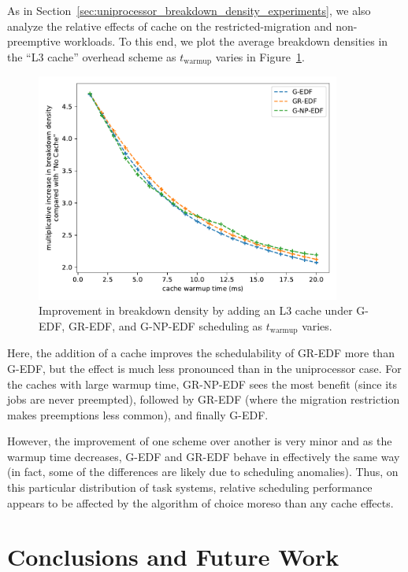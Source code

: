 \documentclass[11pt]{article}
\newcommand{\figref}[1]{Figure~\ref{#1}}
\newcommand{\secref}[1]{Section~\ref{#1}}
\begin{document}
As in \secref{sec:uniprocessor_breakdown_density_experiments}, we also analyze the relative effects of cache on the restricted-migration and non-preemptive workloads. To this end, we plot the average breakdown densities in the ``L3 cache'' overhead scheme as $t_\text{warmup}$ varies in \figref{fig:multiprocessor_cache_warmup_plots}.

\begin{figure}
	\centering
	\includegraphics[width=10cm]{multiprocessor_breakdown_density_vs_cache_warmup.pdf}
	\caption{Improvement in breakdown density by adding an L3 cache under G-EDF, GR-EDF, and G-NP-EDF scheduling as $t_\text{warmup}$ varies.}
	\label{fig:multiprocessor_cache_warmup_plots}
\end{figure}

Here, the addition of a cache improves the schedulability of GR-EDF more than G-EDF, but the effect is much less pronounced than in the uniprocessor case. For the caches with large warmup time, GR-NP-EDF sees the most benefit (since its jobs are never preempted), followed by GR-EDF (where the migration restriction makes preemptions less common), and finally G-EDF.

However, the improvement of one scheme over another is very minor and as the warmup time decreases, G-EDF and GR-EDF behave in effectively the same way (in fact, some of the differences are likely due to scheduling anomalies). Thus, on this particular distribution of task systems, relative scheduling performance appears to be affected by the algorithm of choice moreso than any cache effects.

\section{Conclusions and Future Work}
\label{sec:Conclusion}
\end{document}
